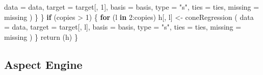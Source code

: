 \documentclass[
  12pt,
]{book}
\newenvironment{Shaded}{\begin{snugshade}}{\end{snugshade}}
\newcommand{\AttributeTok}[1]{\textcolor[rgb]{0.77,0.63,0.00}{#1}}
\newcommand{\ControlFlowTok}[1]{\textcolor[rgb]{0.13,0.29,0.53}{\textbf{#1}}}
\newcommand{\DecValTok}[1]{\textcolor[rgb]{0.00,0.00,0.81}{#1}}
\newcommand{\FunctionTok}[1]{\textcolor[rgb]{0.00,0.00,0.00}{#1}}
\newcommand{\NormalTok}[1]{#1}
\newcommand{\OtherTok}[1]{\textcolor[rgb]{0.56,0.35,0.01}{#1}}
\newcommand{\SpecialCharTok}[1]{\textcolor[rgb]{0.00,0.00,0.00}{#1}}
\newcommand{\StringTok}[1]{\textcolor[rgb]{0.31,0.60,0.02}{#1}}
\begin{document}
\begin{Shaded}
\begin{Highlighting}[]
            \AttributeTok{data =}\NormalTok{ data,}
            \AttributeTok{target =}\NormalTok{ target[, }\DecValTok{1}\NormalTok{],}
            \AttributeTok{basis =}\NormalTok{ basis,}
            \AttributeTok{type =} \StringTok{"s"}\NormalTok{,}
            \AttributeTok{ties =}\NormalTok{ ties,}
            \AttributeTok{missing =}\NormalTok{ missing}
\NormalTok{          )}
\NormalTok{      \}}
\NormalTok{    \}}
    \ControlFlowTok{if}\NormalTok{ (copies }\SpecialCharTok{\textgreater{}} \DecValTok{1}\NormalTok{) \{}
      \ControlFlowTok{for}\NormalTok{ (l }\ControlFlowTok{in} \DecValTok{2}\SpecialCharTok{:}\NormalTok{copies)}
\NormalTok{        h[, l] }\OtherTok{\textless{}{-}}
          \FunctionTok{coneRegression}\NormalTok{ (}
            \AttributeTok{data =}\NormalTok{ data,}
            \AttributeTok{target =}\NormalTok{ target[, l],}
            \AttributeTok{basis =}\NormalTok{ basis,}
            \AttributeTok{type =} \StringTok{"s"}\NormalTok{,}
            \AttributeTok{ties =}\NormalTok{ ties,}
            \AttributeTok{missing =}\NormalTok{ missing}
\NormalTok{          )}
\NormalTok{    \}}
    \FunctionTok{return}\NormalTok{ (h)}
\NormalTok{  \}}
\end{Highlighting}
\end{Shaded}

\hypertarget{aspect-engine}{%
\subsection{Aspect Engine}\label{aspect-engine}}
\end{document}
